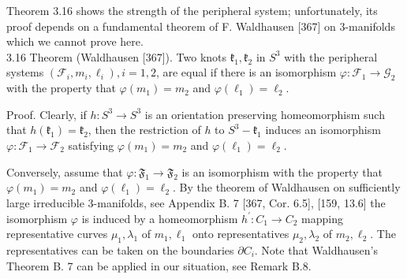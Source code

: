 \documentclass[10pt, letterpaper]{article}
\begin{document}
Theorem 3.16 shows the strength of the peripheral system; unfortunately, its proof depends on a fundamental theorem of F. Waldhausen [367] on 3-manifolds which we cannot prove here.\\[0pt]
3.16 Theorem (Waldhausen [367]). Two knots $\mathfrak{k}_{1}, \mathfrak{k}_{2}$ in $S^{3}$ with the peripheral systems $\left(\mathscr{F}_{i}, m_{i}, \ell_{i}\right), i=1,2$, are equal if there is an isomorphism $\varphi: \mathscr{F}_{1} \rightarrow \mathscr{G}_{2}$ with the property that $\varphi\left(m_{1}\right)=m_{2}$ and $\varphi\left(\ell_{1}\right)=\ell_{2}$.

Proof. Clearly, if $h: S^{3} \rightarrow S^{3}$ is an orientation preserving homeomorphism such that $h\left(\mathfrak{k}_{1}\right)=\mathfrak{k}_{2}$, then the restriction of $h$ to $S^{3}-\mathfrak{k}_{1}$ induces an isomorphism $\varphi: \mathscr{F}_{1} \rightarrow \mathscr{F}_{2}$ satisfying $\varphi\left(m_{1}\right)=m_{2}$ and $\varphi\left(\ell_{1}\right)=\ell_{2}$.

Conversely, assume that $\varphi: \mathfrak{F}_{1} \rightarrow \mathfrak{F}_{2}$ is an isomorphism with the property that $\varphi\left(m_{1}\right)=m_{2}$ and $\varphi\left(\ell_{1}\right)=\ell_{2}$. By the theorem of Waldhausen on sufficiently large irreducible 3-manifolds, see Appendix B. 7 [367, Cor. 6.5], [159, 13.6] the isomorphism $\varphi$ is induced by a homeomorphism $h^{\prime}: C_{1} \rightarrow C_{2}$ mapping representative curves $\mu_{1}, \lambda_{1}$ of $m_{1}, \ell_{1}$ onto representatives $\mu_{2}, \lambda_{2}$ of $m_{2}, \ell_{2}$. The representatives can be taken on the boundaries $\partial C_{i}$. Note that Waldhausen's Theorem B. 7 can be applied in our situation, see Remark B.8.
\end{document}
